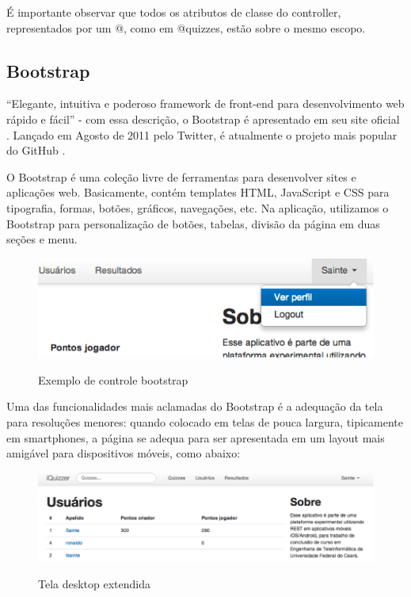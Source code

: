             É importante observar que todos os atributos de classe do controller, representados por um @, como em @quizzes, estão sobre o mesmo escopo.
			
    \subsection{Bootstrap}
            ``Elegante, intuitiva e poderoso framework de front-end para desenvolvimento web rápido e fácil'' - com essa descrição, o Bootstrap é apresentado em seu site oficial \cite{bootstrap}.  Lançado em Agosto de 2011 pelo Twitter, é atualmente o projeto mais popular do GitHub \cite{githubpop}.
			
            O Bootstrap é uma coleção livre de ferramentas para desenvolver sites e aplicações web. Basicamente, contém templates \ac{HTML}, JavaScript e \ac{CSS} para tipografia, formas, botões, gráficos, navegações, etc.
    Na aplicação, utilizamos o Bootstrap para personalização de botões, tabelas, divisão da página em duas seções e menu.
	 \begin{figure}[H]
	   \centering
	   \includegraphics{figs/bootstrapcontrol.png}\\
	   \caption{ Exemplo de controle bootstrap }
	   \label{FIG:bootstrapcontrol}
	 \end{figure}
     
            Uma das funcionalidades mais aclamadas do Bootstrap é a adequação da tela para resoluções menores: quando colocado em telas de pouca largura, tipicamente em smartphones, a página se adequa para ser apresentada em um layout mais amigável para dispositivos móveis, como abaixo:
	 \begin{figure}[H]
	   \centering
	   \includegraphics{figs/bootstraplayout1.png}\\
	   \caption{ Tela desktop extendida}
	   \label{FIG:bootstrapcontrol}
	 \end{figure}
	 
